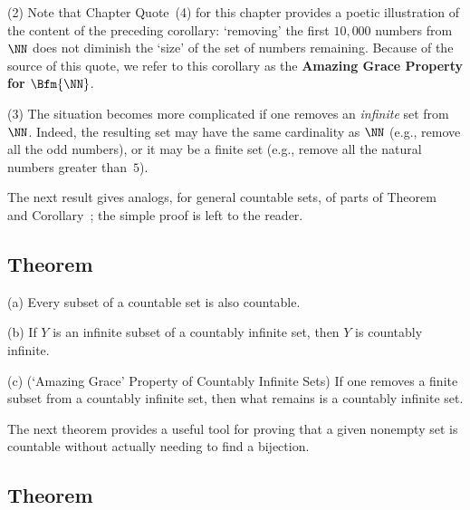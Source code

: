 \V

        (2) Note that Chapter Quote~(4) for this chapter provides a poetic illustration of the content of the preceding corollary:
    `removing' the first $10,000$ numbers from ${\NN}$ does not diminish the `size' of the set of numbers remaining.
    Because of the source of this quote, we refer to this corollary as the {\bf Amazing Grace Property for $\Bfm{{\NN}}$}.


\V

        (3) The situation becomes more complicated if one removes an {\em infinite} set from ${\NN}$.
    Indeed, the resulting set may have the same cardinality as ${\NN}$ (e.g., remove all the odd numbers),
    or it may be a finite set (e.g., remove all the natural numbers greater than~$5$).

\V
\V


        The next result gives analogs, for general countable sets, of parts of Theorem~ and Corollary~;
    the simple proof is left to the reader.


            \subsection{\small{\bf Theorem}}
            \label{ThmA20.50}

        \hspace*{\parindent}(a) Every subset of a countable set is also countable.

\V

        (b) If $Y$ is an infinite subset of a countably infinite set, then $Y$ is countably infinite.

\V

        (c) (`Amazing Grace' Property of Countably Infinite Sets) 
    If one removes a finite subset from a countably infinite set, then what remains is a countably infinite set.

\V
\V

        The next theorem provides a useful tool for proving that a given nonempty set is countable without actually needing to find a bijection.


\V

            \subsection{\small{\bf Theorem}}
            \label{ThmA20.25A}

